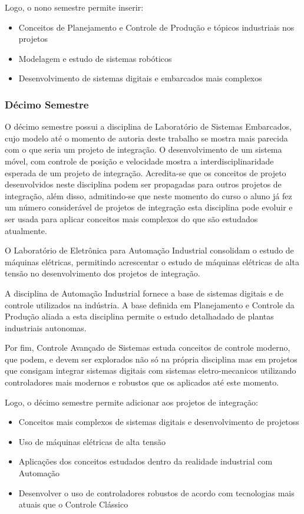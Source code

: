 \documentclass[12pt]{article} %
\begin{document}
Logo, o nono semestre permite inserir:

\begin{itemize}
\item Conceitos de Planejamento e Controle de Produção e tópicos industriais nos projetos
\item Modelagem e estudo de sistemas robóticos
\item Desenvolvimento de sistemas digitais e embarcados mais complexos
\end{itemize}

\subsubsection{Décimo Semestre}

O décimo semestre possui a disciplina de Laboratório de Sistemas Embarcados, cujo modelo até o momento de autoria deste trabalho se mostra mais parecida com o que seria um projeto de integração. O desenvolvimento de um sistema móvel, com controle de posição e velocidade mostra a interdisciplinaridade esperada de um projeto de integração. Acredita-se que os conceitos de projeto desenvolvidos neste disciplina podem ser propagadas para outros projetos de integração, além disso, admitindo-se que neste momento do curso o aluno já fez um número considerável de projetos de integração esta disciplina pode evoluir e ser usada para aplicar conceitos mais complexos do que são estudados atualmente.

O Laboratório de Eletrônica para Automação Industrial consolidam o estudo de máquinas elétricas, permitindo acrescentar o estudo de máquinas elétricas de alta tensão no desenvolvimento dos projetos de integração.

A disciplina de Automação Industrial fornece a base de sistemas digitais e de controle utilizados na indústria. A base definida em Planejamento e Controle da Produção aliada a esta disciplina permite o estudo detalhadado de plantas industriais autonomas.

Por fim, Controle Avançado de Sistemas estuda conceitos de controle moderno, que podem, e devem ser explorados não só na própria disciplina mas em projetos que consigam integrar sistemas digitais com sistemas eletro-mecanicos utilizando controladores mais modernos e robustos que os aplicados até este momento.

Logo, o décimo semestre permite adicionar aos projetos de integração:

\begin{itemize}
\item Conceitos mais complexos de sistemas digitais e desenvolvimento de projetoss
\item Uso de máquinas elétricas de alta tensão
\item Aplicações dos conceitos estudados dentro da realidade industrial com Automação
\item Desenvolver o uso de controladores robustos de acordo com tecnologias mais atuais que o Controle Clássico
\end{itemize}
\end{document}

